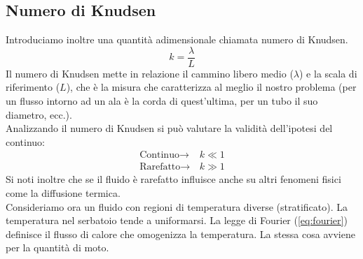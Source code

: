   \subsection{Numero di Knudsen}
  Introduciamo inoltre una quantità adimensionale chiamata numero di Knudsen.
  \begin{equation}
    \label{eq:knudsen}
    k = \frac{\lambda}{L}
  \end{equation}
  Il numero di Knudsen mette in relazione il cammino libero medio ($ \lambda  $) e la scala di riferimento ($ L $), che è la misura che caratterizza al meglio il nostro problema (per un flusso intorno ad un ala è la corda di quest'ultima, per un tubo il suo diametro, ecc.).\\
  Analizzando il numero di Knudsen si può valutare la validità dell'ipotesi del continuo:
  \begin{equation}
    \label{eq:cont_raref}
    \begin{aligned}
      \text{Continuo} \to\, &k\ll 1\\
      \text{Rarefatto} \to\, &k\gg 1
    \end{aligned}
  \end{equation}
  Si noti inoltre che se il fluido è rarefatto influisce anche su altri fenomeni fisici come la diffusione termica.\\
  Consideriamo ora un fluido con regioni di temperatura diverse (stratificato).
  La temperatura nel serbatoio tende a uniformarsi.
  La legge di Fourier (\cref{eq:fourier}) definisce il flusso di calore che omogenizza la temperatura. La stessa cosa avviene per la quantità di moto.
